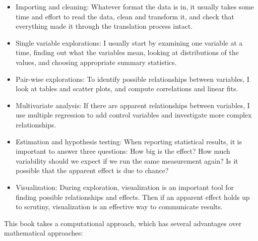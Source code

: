 \documentclass[12pt]{book}
\theoremstyle{exercise}
\begin{document}
\begin{itemize}

\item Importing and cleaning: Whatever format the data is in, it
  usually takes some time and effort to read the data, clean and
  transform it, and check that everything made it through the
  translation process intact.%

\item Single variable explorations: I usually start by examining one
  variable at a time, finding out what the variables mean, looking
  at distributions of the values, and choosing appropriate
  summary statistics.%

\item Pair-wise explorations: To identify possible relationships
  between variables, I look at tables and scatter plots, and compute
  correlations and linear fits.%
%

\item Multivariate analysis: If there are apparent relationships
  between variables, I use multiple regression to add control variables
  and investigate more complex relationships.%
%

\item Estimation and hypothesis testing: When reporting statistical
  results, it is important to answer three questions: How big is
  the effect?  How much variability should we expect if we run the same
  measurement again?  Is it possible that the apparent effect is
  due to chance?%
%

\item Visualization: During exploration, visualization is an important 
  tool for finding possible relationships and effects.  Then if an
  apparent effect holds up to scrutiny, visualization is an effective
  way to communicate results.%

\end{itemize}

This book takes a computational approach, which has several
advantages over mathematical approaches:%
\end{document}
